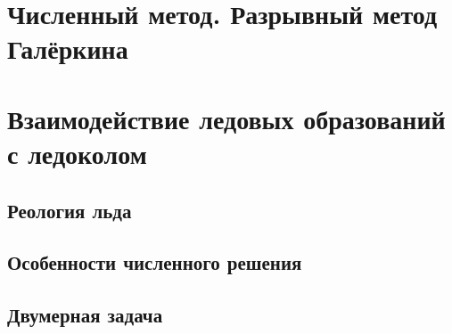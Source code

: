 \documentclass[12pt,a4paper, titlepage, openany]{book}
\begin{document}
\chapter{Численный метод. Разрывный метод Галёркина}

\chapter{Взаимодействие ледовых образований с ледоколом}
\section*{Реология льда}

\section*{Особенности численного решения}

\section*{Двумерная задача}
\end{document}
